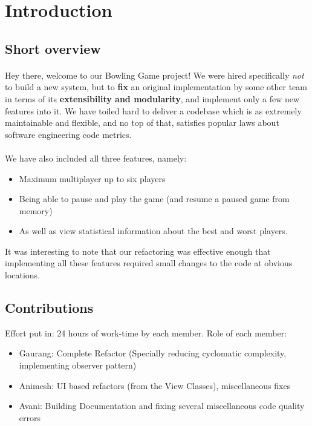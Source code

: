 \section{Introduction}

\subsection{Short overview}

\paragraph{} Hey there, welcome to our Bowling Game project! We were hired specifically \textit{not} to build a new system, but to \textbf{fix} an original implementation by some other team in terms of its \textbf{extensibility and modularity}, and implement only a few new features into it. We have toiled hard to deliver a codebase which is as extremely maintainable and flexible, and no top of that, satisfies popular laws about software engineering code metrics.
\paragraph{} We have also included all three features, namely:
\begin{itemize}
    \item Maximum multiplayer up to six players
    \item Being able to pause and play the game (and resume a paused game from memory)
    \item As well as view statistical information about the best and worst players.
\end{itemize}
It was interesting to note that our refactoring was effective enough that implementing all these features required small changes to the code at obvious locations.

\subsection{Contributions}

Effort put in: 24 hours of work-time by each member. Role of each member:
\begin{itemize}
    \item Gaurang: Complete Refactor (Specially reducing cyclomatic complexity, implementing observer pattern)
    \item Animesh: UI based refactors (from the View Classes), miscellaneous fixes
    \item Avani: Building Documentation and fixing several miscellaneous code quality errors
\end{itemize}
